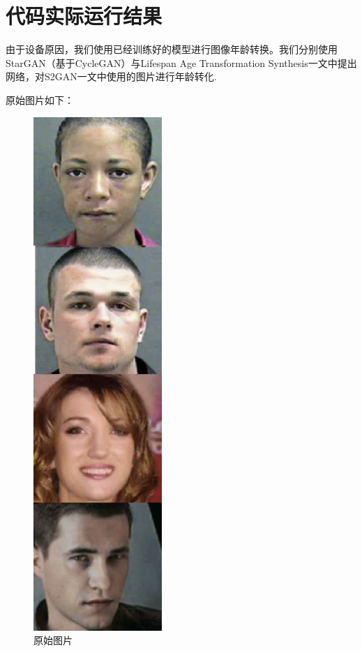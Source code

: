 \documentclass[12pt,a4paper]{article}
\begin{document}
\section{代码实际运行结果}
由于设备原因，我们使用已经训练好的模型进行图像年龄转换。我们分别使用StarGAN（基于CycleGAN）与Lifespan Age Transformation Synthesis一文中提出网络，对S2GAN一文中使用的图片进行年龄转化.


原始图片如下：
\begin{figure}[H]
	\centering
	\includegraphics[scale=0.35]{assets/origin.png}
	\caption{原始图片}
\end{figure}
\end{document}
